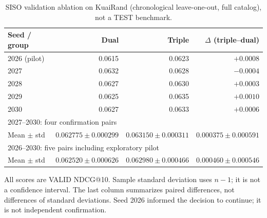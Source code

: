 \begin{table}[t]
\centering
\small
\caption{SISO validation ablation on KuaiRand (chronological leave-one-out, full catalog), not a TEST benchmark.}
\label{tab:siso-dual-triple-validation}
\begin{tabular}{lrrr}
\toprule
Seed / group & Dual & Triple & $\Delta$ (triple--dual) \\
\midrule
2026 (pilot) & 0.0615 & 0.0623 & $+0.0008$ \\
2027 & 0.0632 & 0.0628 & $-0.0004$ \\
2028 & 0.0627 & 0.0630 & $+0.0003$ \\
2029 & 0.0625 & 0.0635 & $+0.0010$ \\
2030 & 0.0627 & 0.0633 & $+0.0006$ \\
\midrule
\multicolumn{4}{l}{2027--2030: four confirmation pairs} \\
Mean $\pm$ std & $0.062775 \pm 0.000299$ & $0.063150 \pm 0.000311$ & $0.000375 \pm 0.000591$ \\
\midrule
\multicolumn{4}{l}{2026--2030: five pairs including exploratory pilot} \\
Mean $\pm$ std & $0.062520 \pm 0.000626$ & $0.062980 \pm 0.000466$ & $0.000460 \pm 0.000546$ \\
\bottomrule
\end{tabular}
\par\smallskip
\begin{minipage}{0.98\linewidth}\footnotesize
All scores are VALID NDCG@10. Sample standard deviation uses $n-1$; it is not a confidence interval. The last column summarizes paired differences, not differences of standard deviations. Seed 2026 informed the decision to continue; it is not independent confirmation.
\end{minipage}
\end{table}
